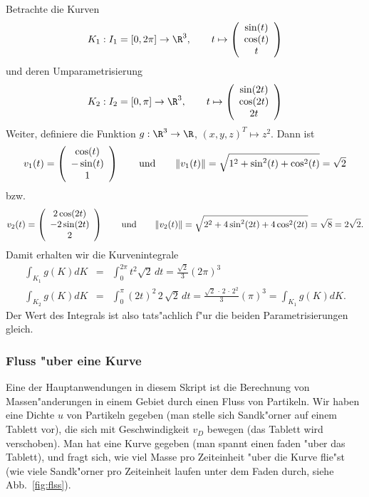 \begin{bspX}
Betrachte die Kurven
$$ K_1: I_1=[0,2\pi]\rightarrow\R^3,\qquad t\mapsto 
\left(\begin{array}{c} \sin(t)\\ \cos(t)\\ t\end{array}\right)
$$
und deren Umparametrisierung
$$ K_2: I_2=[0,\pi]\rightarrow\R^3,\qquad t\mapsto 
\left(\begin{array}{c} \sin(2t)\\ \cos(2t)\\ 2t\end{array}\right)
$$
Weiter, definiere die Funktion $g:\R^3\rightarrow \R$, $(x,y,z)^T\mapsto z^2$.
Dann ist 
$$ v_1(t) = \left(\begin{array}{c} \cos(t)\\ -\sin(t)\\ 1\end{array}\right)
\qquad\mbox{\rm und}\qquad
\|v_1(t)\| = \sqrt{1^2+\sin^2(t)+\cos^2(t)} = \sqrt{2}$$
bzw.\
$$ v_2(t) = \left(\begin{array}{c} 2\cos(2t)\\ -2\sin(2t)\\ 2\end{array}\right)
\qquad\mbox{{\rm und}}\qquad
\|v_2(t)\| = \sqrt{2^2 +4\sin^2(2t)+4\cos^2(2t)} = \sqrt{8} = 2\sqrt{2}.
$$
Damit erhalten wir die Kurvenintegrale
\begin{eqnarray*}
\int_{K_1}g(K) dK & = & \int_0^{2\pi} t^2 \sqrt{2}\, dt = \frac {\sqrt{2}}3 (2\pi)^3\\
\int_{K_2}g(K) dK & = & \int_0^{\pi} (2t)^2 \,2\,\sqrt{2}\, dt = \frac {\sqrt{2}\, \cdot\,2\,\cdot\, 2^2}3 (\pi)^3 = \int_{K_1}g(K) dK. 
\end{eqnarray*}
Der Wert des Integrals ist also tats"achlich f"ur die beiden Parametrisierungen gleich.
\end{bspX}
\subsubsection{Fluss "uber eine Kurve}
Eine der Hauptanwendungen in diesem Skript ist die Berechnung von
 Massen"anderungen in einem Gebiet durch einen Fluss von Partikeln. Wir haben
eine Dichte $u$ von Partikeln gegeben (man stelle sich Sandk"orner auf einem
Tablett vor), die sich mit Geschwindigkeit $v_D$ bewegen (das Tablett wird 
verschoben). Man hat eine Kurve gegeben (man spannt einen faden "uber das 
 Tablett), und fragt sich, wie viel Masse pro Zeiteinheit "uber die Kurve 
flie"st 
(wie viele Sandk"orner pro Zeiteinheit laufen unter dem Faden durch, siehe
Abb.~\ref{fig:flss}).

